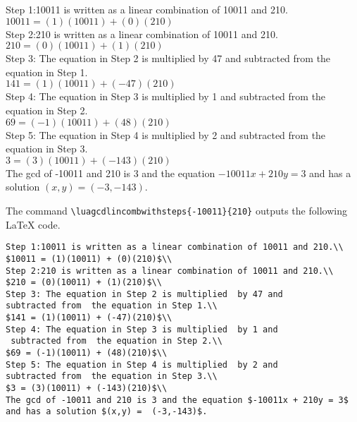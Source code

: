 \documentclass{article}
\begin{document}
\begin{framed}
\noindent Step 1:10011 is written as a linear combination of 10011 and 210.\\
$10011 = (1)(10011) + (0)(210)$\\
Step 2:210 is written as a linear combination of 10011 and 210.\\
$210 = (0)(10011) + (1)(210)$\\
Step 3: The equation in Step 2 is multiplied  by 47 and 
subtracted from  the equation in Step 1.\\
$141 = (1)(10011) + (-47)(210)$\\
Step 4: The equation in Step 3 is multiplied  by 1 and
 subtracted from  the equation in Step 2.\\
$69 = (-1)(10011) + (48)(210)$\\
Step 5: The equation in Step 4 is multiplied  by 2 and 
subtracted from  the equation in Step 3.\\
$3 = (3)(10011) + (-143)(210)$\\
The gcd of -10011 and 210 is 3 and the equation $-10011x + 210y = 3$ 
and has a solution $(x,y) =  (-3,-143)$.
\end{framed}

The command \verb|\luagcdlincombwithsteps{-10011}{210}| outputs  the following LaTeX code.
\begin{lstlisting}
Step 1:10011 is written as a linear combination of 10011 and 210.\\
$10011 = (1)(10011) + (0)(210)$\\
Step 2:210 is written as a linear combination of 10011 and 210.\\
$210 = (0)(10011) + (1)(210)$\\
Step 3: The equation in Step 2 is multiplied  by 47 and 
subtracted from  the equation in Step 1.\\
$141 = (1)(10011) + (-47)(210)$\\
Step 4: The equation in Step 3 is multiplied  by 1 and
 subtracted from  the equation in Step 2.\\
$69 = (-1)(10011) + (48)(210)$\\
Step 5: The equation in Step 4 is multiplied  by 2 and 
subtracted from  the equation in Step 3.\\
$3 = (3)(10011) + (-143)(210)$\\
The gcd of -10011 and 210 is 3 and the equation $-10011x + 210y = 3$ 
and has a solution $(x,y) =  (-3,-143)$.
\end{lstlisting}



\printbibliography
\end{document}

